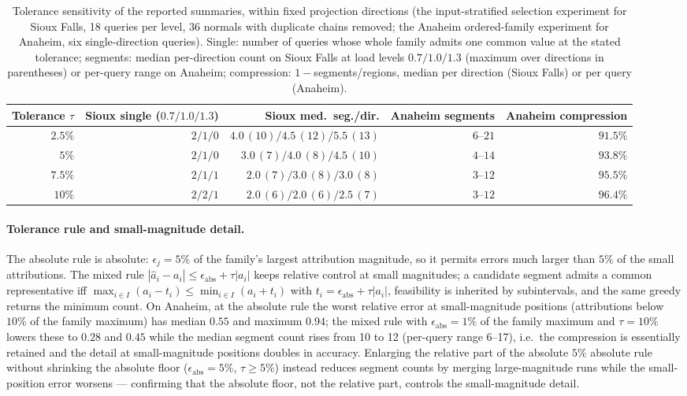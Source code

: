 \begin{table}[pos=htbp]\centering\footnotesize
\caption{Tolerance sensitivity of the reported summaries, within
fixed projection directions (the input-stratified selection experiment for Sioux Falls, 18 queries
per level, 36 normals with duplicate chains removed; the Anaheim ordered-family experiment for
Anaheim, six single-direction queries). Single: number of queries whose
whole family admits one common value at the stated tolerance;
segments: median per-direction count on Sioux Falls at load levels
$0.7/1.0/1.3$ (maximum over directions in parentheses) or per-query
range on Anaheim; compression: $1-$segments/regions, median per
direction (Sioux Falls) or per query (Anaheim).}\label{tab:tolerance}
\begin{tabular}{rrrrr}\toprule
Tolerance $\tau$ & Sioux single ($0.7/1.0/1.3$) & Sioux med.\ seg./dir. & Anaheim segments & Anaheim compression\\\midrule
$2.5\%$ & $2/1/0$ & $4.0\,(10)/4.5\,(12)/5.5\,(13)$ & $6$--$21$ & $91.5\%$\\
$5\%$ & $2/1/0$ & $3.0\,(7)/4.0\,(8)/4.5\,(10)$ & $4$--$14$ & $93.8\%$\\
$7.5\%$ & $2/1/1$ & $2.0\,(7)/3.0\,(8)/3.0\,(8)$ & $3$--$12$ & $95.5\%$\\
$10\%$ & $2/2/1$ & $2.0\,(6)/2.0\,(6)/2.5\,(7)$ & $3$--$12$ & $96.4\%$\\
\bottomrule\end{tabular}\end{table}

\paragraph{Tolerance rule and small-magnitude detail.}\label{supp:tolerance}
The absolute rule is absolute: $\epsilon_j=5\%$ of the family's largest
attribution magnitude, so it permits errors much larger than $5\%$ of the
small attributions. The mixed rule
$|\hat a_i-a_i|\le\epsilon_{\mathrm{abs}}+\tau|a_i|$ keeps relative
control at small magnitudes; a candidate segment admits a common
representative iff $\max_{i\in I}(a_i-t_i)\le\min_{i\in I}(a_i+t_i)$
with $t_i=\epsilon_{\mathrm{abs}}+\tau|a_i|$, feasibility is inherited
by subintervals, and the same greedy returns the minimum count. On
Anaheim, at the absolute rule the worst relative error at
small-magnitude positions (attributions below $10\%$ of the family
maximum) has median $0.55$ and maximum $0.94$; the mixed rule with
$\epsilon_{\mathrm{abs}}=1\%$ of the family maximum and $\tau=10\%$
lowers these to $0.28$ and $0.45$ while the median segment count rises
from 10 to 12 (per-query range 6--17), i.e.\ the compression is
essentially retained and the detail at small-magnitude positions
doubles in accuracy. Enlarging the relative part of the absolute
$5\%$ absolute rule without shrinking the absolute floor
($\epsilon_{\mathrm{abs}}=5\%$, $\tau\ge5\%$) instead reduces
segment counts by merging large-magnitude runs while the
small-position error worsens --- confirming that the absolute floor,
not the relative part, controls the small-magnitude detail.

